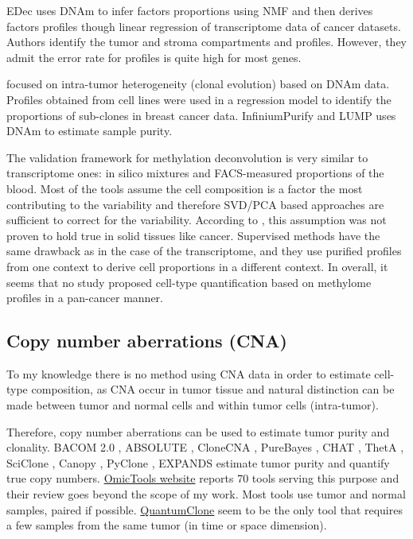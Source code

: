\documentclass[12pt,]{book}
\theoremstyle{definition}
\theoremstyle{definition}
\theoremstyle{definition}
\theoremstyle{remark}
\begin{document}
EDec \citep{Onuchic2016} uses DNAm to infer factors proportions using
NMF and then derives factors profiles though linear regression of
transcriptome data of cancer datasets. Authors identify the tumor and
stroma compartments and profiles. However, they admit the error rate for
profiles is quite high for most genes.

\citet{Wen2016} focused on intra-tumor heterogeneity (clonal evolution)
based on DNAm data. Profiles obtained from cell lines were used in a
regression model to identify the proportions of sub-clones in breast
cancer data. InfiniumPurify \citep{Zheng2017} and LUMP \citep{Aran2015}
uses DNAm to estimate sample purity.

The validation framework for methylation deconvolution is very similar
to transcriptome ones: in silico mixtures and FACS-measured proportions
of the blood. Most of the tools assume the cell composition is a factor
the most contributing to the variability and therefore SVD/PCA based
approaches are sufficient to correct for the variability. According to
\citet{Teschendorff2017}, this assumption was not proven to hold true in
solid tissues like cancer. Supervised methods have the same drawback as
in the case of the transcriptome, and they use purified profiles from
one context to derive cell proportions in a different context. In
overall, it seems that no study proposed cell-type quantification based
on methylome profiles in a pan-cancer manner.

\hypertarget{copy-number-aberrations-cna}{%
\subsection{Copy number aberrations
(CNA)}\label{copy-number-aberrations-cna}}

To my knowledge there is no method using CNA data in order to estimate
cell-type composition, as CNA occur in tumor tissue and natural
distinction can be made between tumor and normal cells and within tumor
cells (intra-tumor).

Therefore, copy number aberrations can be used to estimate tumor purity
and clonality. BACOM 2.0 \citep{Fu2015}, ABSOLUTE \citep{Carter2012},
CloneCNA \citep{Yu2016}, PureBayes \citep{Larson2013}, CHAT
\citep{Li2014}, ThetA \citep{Oesper2013}, SciClone \citep{Miller2014},
Canopy \citep{Jiang2016}, PyClone \citep{Roth2014}, EXPANDS
\citep{Andor2014} estimate tumor purity and quantify true copy numbers.
\href{https://omictools.com/tumor-purity-and-heterogeneity-category}{OmicTools
website} reports 70 tools serving this purpose and their review goes
beyond the scope of my work. Most tools use tumor and normal samples,
paired if possible.
\href{https://github.com/DeveauP/QuantumClone/}{QuantumClone} seem to be
the only tool that requires a few samples from the same tumor (in time
or space dimension).
\end{document}
